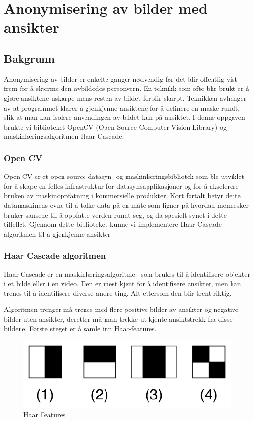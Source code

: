 \newpage
\section{Anonymisering av bilder med ansikter}
\label{sec:Anonymisering}
\subsection{Bakgrunn}
Anonymisering av bilder er enkelte ganger nødvendig før det blir offentlig vist frem for å skjerme den avbildedes personvern. En teknikk som ofte blir brukt er å gjøre ansiktene uskarpe mens resten av bildet forblir skarpt. Teknikken avhenger av at programmet klarer å gjenkjenne ansiktene\cite{wiki:FaceDetection} for å definere en maske rundt, slik at man kan isolere anvendingen av bildet kun på ansiktet. I denne oppgaven brukte vi biblioteket OpenCV (Open Source Computer Vision Library) og maskinlæringsalgoritmen Haar Cascade. 

\subsubsection{Open CV}
Open CV er et open source datasyn-\cite{datasyn} og maskinlæringsbibliotek som ble utviklet for å skape en felles infrastruktur for datasynsapplikasjoner og for å akselerere bruken av maskinoppfatning i kommersielle produkter\cite{cv2}. Kort fortalt betyr dette datamaskinens evne til å tolke data på en måte som ligner på hvordan mennesker bruker sansene til å oppfatte verden rundt seg, og da spesielt synet i dette tilfellet. Gjennom dette biblioteket kunne vi implementere Haar Cascade algoritmen til å gjenkjenne ansikter

\subsubsection{Haar Cascade algoritmen}
Haar Cascade er en maskinlæringsalgoritme~\cite{haar} som brukes til å identifisere objekter i et bilde eller i en video. Den er mest kjent for å identifisere ansikter, men kan trenes til å identifisere diverse andre ting. Alt ettersom den blir trent riktig.

Algoritmen trenger må trenes med flere positive bilder av ansikter og negative bilder uten ansikter, deretter må man trekke ut kjente ansiktstrekk fra disse bildene. Første steget er å samle inn Haar-features. 

\begin{figure}[H]
\begin{center}
    \includegraphics[width=0.4\columnwidth]{bilder/Anonymisering/VJ_featureTypes.svg.png}
     \caption{Haar Features\label{fig:haarfeat}} 
\end{center}
\end{figure}

